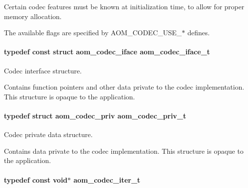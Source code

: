 Certain codec features must be known at initialization time, to allow for proper memory allocation.

The available flags are specified by A\+O\+M\+\_\+\+C\+O\+D\+E\+C\+\_\+\+U\+S\+E\+\_\+$\ast$ defines. 
\paragraph[{\texorpdfstring{aom\+\_\+codec\+\_\+iface\+\_\+t}{aom_codec_iface_t}}]{\setlength{\rightskip}{0pt plus 5cm}typedef const struct aom\+\_\+codec\+\_\+iface {\bf aom\+\_\+codec\+\_\+iface\+\_\+t}}\hypertarget{group__codec_ga4ef55b44c762836d1550e11921bed403}{}\label{group__codec_ga4ef55b44c762836d1550e11921bed403}


Codec interface structure. 

Contains function pointers and other data private to the codec implementation. This structure is opaque to the application. 
\paragraph[{\texorpdfstring{aom\+\_\+codec\+\_\+priv\+\_\+t}{aom_codec_priv_t}}]{\setlength{\rightskip}{0pt plus 5cm}typedef struct aom\+\_\+codec\+\_\+priv {\bf aom\+\_\+codec\+\_\+priv\+\_\+t}}\hypertarget{group__codec_ga3671963ca4b3d6c2adbc186c8ed18023}{}\label{group__codec_ga3671963ca4b3d6c2adbc186c8ed18023}


Codec private data structure. 

Contains data private to the codec implementation. This structure is opaque to the application. 
\paragraph[{\texorpdfstring{aom\+\_\+codec\+\_\+iter\+\_\+t}{aom_codec_iter_t}}]{\setlength{\rightskip}{0pt plus 5cm}typedef const void$\ast$ {\bf aom\+\_\+codec\+\_\+iter\+\_\+t}}\hypertarget{group__codec_gadf9e173c9e02788a9999399edab20a02}{}\label{group__codec_gadf9e173c9e02788a9999399edab20a02}


